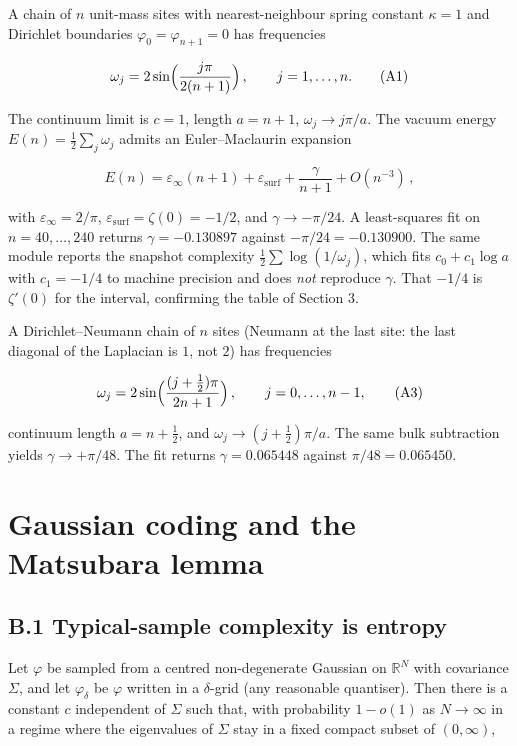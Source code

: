 \documentclass[11pt,letterpaper]{article}
\begin{document}
A chain of \(n\) unit-mass sites with nearest-neighbour spring constant \(\kappa=1\) and Dirichlet boundaries \(\varphi_0=\varphi_{n+1}=0\) has frequencies


\[
\omega_j=2\sin\Bigl(\frac{j\pi}{2(n+1)}\Bigr)\,,\qquad j=1,\ldots,n.
\tag{A1}
\]


The continuum limit is \(c=1\), length \(a=n+1\), \(\omega_j\to j\pi/a\). The vacuum energy \(E(n)=\tfrac12\sum_j\omega_j\) admits an Euler–Maclaurin expansion


\[
E(n)=\varepsilon_\infty(n+1)+\varepsilon_{\mathrm{surf}}+\frac{\gamma}{n+1}+O(n^{-3})\,,
\tag{A2}
\]


with \(\varepsilon_\infty=2/\pi\), \(\varepsilon_{\mathrm{surf}}=\zeta(0)=-1/2\), and \(\gamma\to-\pi/24\). A least-squares fit on \(n=40,\ldots,240\) returns \(\gamma=-0.130897\) against \(-\pi/24=-0.130900\). The same module reports the snapshot complexity \(\tfrac12\sum\log(1/\omega_j)\), which fits \(c_0+c_1\log a\) with \(c_1=-1/4\) to machine precision and does \emph{not} reproduce \(\gamma\). That \(-1/4\) is \(\zeta'(0)\) for the interval, confirming the table of Section 3.


A Dirichlet–Neumann chain of \(n\) sites (Neumann at the last site: the last diagonal of the Laplacian is \(1\), not \(2\)) has frequencies


\[
\omega_j=2\sin\Bigl(\frac{(j+\tfrac12)\pi}{2n+1}\Bigr)\,,\qquad j=0,\ldots,n-1,
\tag{A3}
\]


continuum length \(a=n+\tfrac12\), and \(\omega_j\to(j+\tfrac12)\pi/a\). The same bulk subtraction yields \(\gamma\to+\pi/48\). The fit returns \(\gamma=0.065448\) against \(\pi/48=0.065450\).



\section{Gaussian coding and the Matsubara lemma}


\subsection{B.1 Typical-sample complexity is entropy}


Let \(\varphi\) be sampled from a centred non-degenerate Gaussian on \(\mathbb{R}^N\) with covariance \(\Sigma\), and let \(\varphi_\delta\) be \(\varphi\) written in a \(\delta\)-grid (any reasonable quantiser). Then there is a constant \(c\) independent of \(\Sigma\) such that, with probability \(1-o(1)\) as \(N\to\infty\) in a regime where the eigenvalues of \(\Sigma\) stay in a fixed compact subset of \((0,\infty)\),
\end{document}
